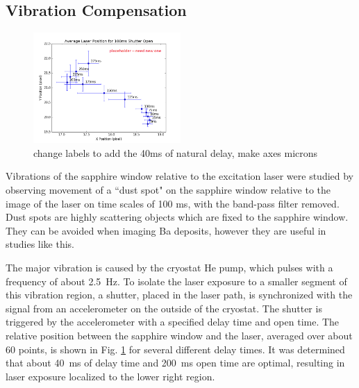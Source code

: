 \documentclass[aps,pra,reprint,superscriptaddress]{revtex4-1}
\begin{document}
\subsection{Vibration Compensation}
\label{subsec:vibes}

\begin{figure}
\includegraphics[width=0.5\textwidth]{figures/vibes_avepos_placeholder_100msShutter.png}
\caption{change labels to add the 40ms of natural delay, make axes microns}
\label{fig:vibes}
\end{figure}


Vibrations of the sapphire window relative to the excitation laser were studied by observing movement of a ``dust spot" on the sapphire window relative to the image of the laser on time scales of 100 ms, with the band-pass filter removed.  Dust spots are highly scattering objects which are fixed to the sapphire window.  They can be avoided when imaging Ba deposits, however they are useful in studies like this.

The major vibration is caused by the cryostat He pump, which pulses with a frequency of about 2.5~Hz.  To isolate the laser exposure to a smaller segment of this vibration region, a shutter, placed in the laser path, is synchronized with the signal from an accelerometer on the outside of the cryostat.  The shutter is triggered by the accelerometer with a specified delay time and open time.  The relative position between the sapphire window and the laser, averaged over about 60 points, is shown in Fig. \ref{fig:vibes} for several different delay times.  It was determined that about 40~ms of delay time and 200~ms open time are optimal, resulting in laser exposure localized to the lower right region. %
\end{document}
